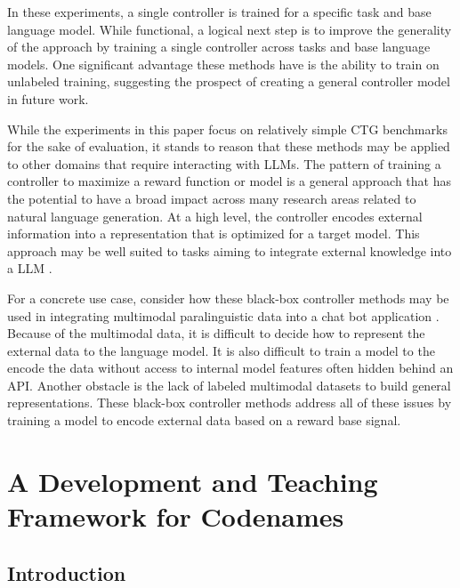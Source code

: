 \documentclass[phd,electronic,oneside,twosidetoc,letterpaper,chaptercenter,parttop,lof]{byumsphd}
\begin{document}
In these experiments, a single controller is trained for a specific task and base language model.
While functional, a logical next step is to improve the generality of the approach by training a single controller across tasks and base language models. 
One significant advantage these methods have is the ability to train on unlabeled training, suggesting the prospect of creating a general controller model in future work.

While the experiments in this paper focus on relatively simple CTG benchmarks for the sake of evaluation, it stands to reason that these methods may be applied to other domains that require interacting with LLMs. 
The pattern of training a controller to maximize a reward function or model is a general approach that has the potential to have a broad impact across many research areas related to natural language generation.
At a high level, the controller encodes external information into a representation that is optimized for a target model.  This approach may be well suited to tasks aiming to integrate external knowledge into a LLM \cite{liu2019kalm, peters2019knowbert, wang2021kepler, morain2022symbolic}.

For a concrete use case, consider how these black-box controller methods may be used in integrating multimodal paralinguistic data into a chat bot application \cite{rumi}.
Because of the multimodal data, it is difficult to decide how to represent the external data to the language model.
It is also difficult to train a model to the encode the data without access to internal model features often hidden behind an API.
Another obstacle is the lack of labeled multimodal datasets to build general representations.
These black-box controller methods address all of these issues by training a model to encode external data based on a reward base signal.

\chapter{A Development and Teaching Framework for Codenames} 
\label{chap:codenames} 


\section{Introduction}
\end{document}
